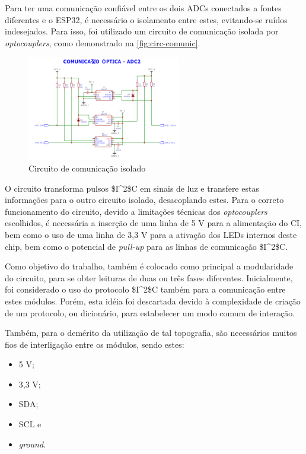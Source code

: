 Para ter uma comunicação confiável entre os dois \gls{ADC}s conectados a fontes diferentes e o ESP32, é necessário o isolamento entre estes, evitando-se ruídos indesejados. Para isso, foi utilizado um circuito de comunicação isolada por \textit{optocouplers}, como demonstrado na \autoref{fig:circ-comunic}.

\begin{figure}[htb!]
    \caption{Circuito de comunicação isolado}
    \label{fig:circ-comunic}
    \includegraphics[width=0.6\textwidth]{figuras/circ-comunic.png}
    \fonte{}
\end{figure}

O circuito transforma pulsos \gls{$I^2$C} em sinais de luz e transfere estas informações para o outro circuito isolado, desacoplando estes. Para o correto funcionamento do circuito, devido a limitações técnicas dos \textit{optocouplers} escolhidos, é necessária a inserção de uma linha de 5 V para a alimentação do \gls{CI}, bem como o uso de uma linha de 3,3 V para a ativação dos LEDs internos deste chip, bem como o potencial de \textit{pull-up} para as linhas de comunicação \gls{$I^2$C}.

Como objetivo do trabalho, também é colocado como principal a modularidade do circuito, para se obter leituras de duas ou três fases diferentes. Inicialmente, foi considerado o uso do protocolo \gls{$I^2$C} também para a comunicação entre estes módulos. Porém, esta idéia foi descartada devido à complexidade de criação de um protocolo, ou dicionário, para estabelecer um modo comum de interação.

Também, para o demérito da utilização de tal topografia, são necessários muitos fios de interligação entre os módulos, sendo estes:

\begin{itemize}
    \item 5 V;
    \item 3,3 V;
    \item SDA;
    \item SCL e
    \item \textit{ground}.
\end{itemize}

